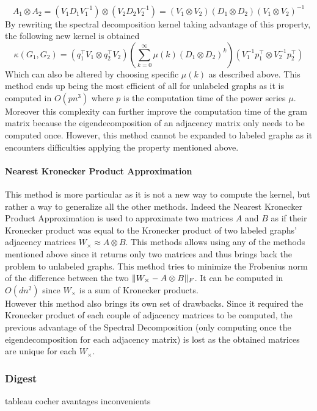 \documentclass{article}
\DeclarePairedDelimiter{\norm}{\lVert}{\rVert}
\theoremstyle{definition}
\begin{document}
\begin{equation}
	A_1 \otimes A_2=(V_{1}D_{1}V_{1}^{-1})\otimes(V_{2}D_{2}V_{2}^{-1})=(V_1\otimes V_2)(D_1 \otimes D_2)(V_1 \otimes V_2)^{-1}
\end{equation}
By rewriting the spectral decomposition kernel taking advantage of this property, the following new kernel is obtained
\begin{equation}
	\kappa(G_1,G_2)=(q_{1}^{\top}V_{1}\otimes q_{2}^{\top}V_{2})(\sum\limits_{k=0}^{\infty}\mu(k)(D_{1}\otimes D_{2})^k)(V_{1}^{-1}p_{1}^{\top}\otimes V_{2}^{-1}p_{2}^{\top})
\end{equation}
Which can also be altered by choosing specific $\mu(k)$ as described above. This method ends up being the most efficient of all for unlabeled graphs as it is computed in $O(pn^3)$ where $p$ is the computation time of the power series $\mu$. Moreover this complexity can further improve the computation time of the gram matrix because the eigendecomposition of an adjacency matrix only needs to be computed once. However, this method cannot be expanded to labeled graphs as it encounters difficulties applying the property mentioned above.
\paragraph{Nearest Kronecker Product Approximation}
This method is more particular as it is not a new way to compute the kernel, but rather a way to generalize all the other methods. Indeed the Nearest Kronecker Product Approximation\cite{van1993approximation} is used to approximate two matrices $A$ and $B$ as if their Kronecker product was equal to the Kronecker product of two labeled graphs' adjacency matrices $W_{\times} \approx A \otimes B$. This methods allows using any of the methods mentioned above since it returns only two matrices and thus brings back the problem to unlabeled graphs. This method tries to minimize the Frobenius norm of the difference between the two $\norm{W_\times - A\otimes B}_F$. It can be computed in $O(dn^2)$ since $W_\times$ is a sum of Kronecker products.\\
However this method also brings its own set of drawbacks. Since it required the Kronecker product of each couple of adjacency matrices to be computed, the previous advantage of the Spectral Decomposition (only computing once the eigendecomposition for each adjacency matrix) is lost as the obtained matrices are unique for each $W_\times$.

\subsubsection{Digest}
tableau cocher avantages inconvenients
\end{document}
